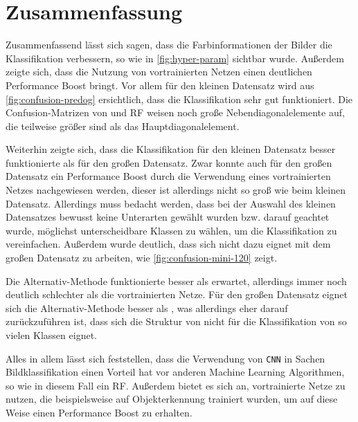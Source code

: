 \section{Zusammenfassung}
Zusammenfassend lässt sich sagen, dass die Farbinformationen der Bilder die
Klassifikation verbessern, so wie in \autoref{fig:hyper-param} sichtbar wurde.
Außerdem zeigte sich, dass die Nutzung von vortrainierten Netzen einen
deutlichen Performance Boost bringt. Vor allem für den kleinen Datensatz wird
aus \autoref{fig:confusion-predog} ersichtlich, dass die Klassifikation sehr gut
funktioniert. Die Confusion-Matrizen von \MiniDog und RF weisen noch große
Nebendiagonalelemente auf, die teilweise größer sind als das
Hauptdiagonalelement.

Weiterhin zeigte sich, dass die Klassifikation für den kleinen Datensatz besser
funktionierte als für den großen Datensatz. Zwar konnte auch für den großen
Datensatz ein Performance Boost durch die Verwendung eines vortrainierten Netzes
nachgewiesen werden, dieser ist allerdings nicht so groß wie beim kleinen
Datensatz. Allerdings muss bedacht werden, dass bei der Auswahl des kleinen
Datensatzes bewusst keine Unterarten gewählt wurden bzw. darauf geachtet wurde,
möglichst unterscheidbare Klassen zu wählen, um die Klassifikation zu
vereinfachen. Außerdem wurde deutlich, dass sich \MiniDog nicht dazu eignet mit
dem großen Datensatz zu arbeiten, wie \autoref{fig:confusion-mini-120} zeigt.

Die Alternativ-Methode funktionierte besser als erwartet, allerdings immer noch
deutlich schlechter als die vortrainierten Netze. Für den großen Datensatz
eignet sich die Alternativ-Methode besser als \MiniDog, was allerdings eher
darauf zurückzuführen ist, dass sich die Struktur von \MiniDog nicht für die
Klassifikation von so vielen Klassen eignet.

Alles in allem lässt sich feststellen, dass die Verwendung von \texttt{CNN} in
Sachen Bildklassifikation einen Vorteil hat vor anderen Machine Learning
Algorithmen, so wie in diesem Fall ein RF. Außerdem bietet es sich an,
vortrainierte Netze zu nutzen, die beispielsweise auf Objekterkennung trainiert
wurden, um auf diese Weise einen Performance Boost zu erhalten.
